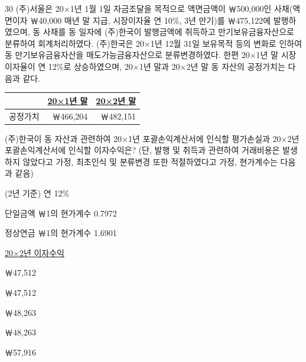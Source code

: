 \begin{question}{30}
(주)서울은 20×1년 1월 1일 자금조달을 목적으로 액면금액이 ￦500,000인 사채(액면이자 ￦40,000 매년 말 지급, 시장이자율 연 10\%, 3년 만기)를 ￦475,122에 발행하였으며, 동 사채를 동 일자에 (주)한국이 발행금액에 취득하고 만기보유금융자산으로 분류하여 회계처리하였다. (주)한국은 20×1년 12월 31일 보유목적 등의 변화로 인하여 동 만기보유금융자산을 매도가능금융자산으로 분류변경하였다. 한편 20×1년 말 시장이자율이 연 12\%로 상승하였으며, 20×1년 말과 20×2년 말 동 자산의 공정가치는 다음과 같다.

{\small\centering
\begin{tabular}{|l|r|r|}
\hline
 & \multicolumn{1}{c|}{\uline{20×1년 말}} & \multicolumn{1}{c|}{\uline{20×2년 말}} \\
\hline
공정가치 & ￦466,204 & ￦482,151 \\
\hline
\end{tabular}\par}

(주)한국이 동 자산과 관련하여 20×1년 포괄손익계산서에 인식할 평가손실과 20×2년 포괄손익계산서에 인식할 이자수익은? (단, 발행 및 취득과 관련하여 거래비용은 발생하지 않았다고 가정, 최초인식 및 분류변경 또한 적절하였다고 가정, 현가계수는 다음과 같음) \par
(2년 기준) 연 12\% \par
단일금액 ￦1의 현가계수 0.7972 \par
정상연금 ￦1의 현가계수 1.6901 \par
\noindent\hspace*{2em}\uline{20×2년 이자수익}\par
\begin{choices}
  \item {}￦47,512
  \item {}￦47,512
  \item {}￦48,263
  \item {}￦48,263
  \item {}￦57,916
\end{choices}
\end{question}
